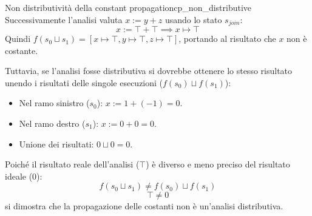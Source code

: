 \begin{nota}{Non distributività della constant propagation}{cp_non_distributive}
Successivamente l'analisi valuta $x := y + z$ usando lo stato $s_{join}$:
\[ x := \top + \top \implies x \mapsto \top \]
Quindi $f(s_0 \sqcup s_1) = [ x \mapsto \top, y \mapsto \top, z \mapsto \top ]$,
portando al risultato che $x$ non è costante.

\medskip

Tuttavia, se l'analisi fosse distributiva si dovrebbe ottenere lo stesso
risultato unendo i risultati delle singole esecuzioni ($f(s_0) \sqcup f(s_1)$):

\begin{itemize}
    \item Nel ramo sinistro ($s_0$): $x := 1 + (-1) = 0$.
    \item Nel ramo destro ($s_1$): $x := 0 + 0 = 0$.
    \item Unione dei risultati: $0 \sqcup 0 = 0$.
\end{itemize}

Poiché il risultato reale dell'analisi ($\top$) è diverso e meno preciso del risultato ideale ($0$):
\[ f(s_0 \sqcup s_1) \neq f(s_0) \sqcup f(s_1) \]
\[ \top \neq 0 \]
si dimostra che la propagazione delle costanti non è un'analisi distributiva.

\end{nota}